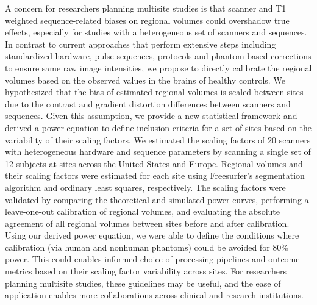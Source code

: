 
A concern for researchers planning multisite studies is that scanner and T1 weighted sequence-related biases on regional volumes could overshadow true effects, especially for studies with a heterogeneous set of scanners and sequences. In contrast to current approaches that perform extensive steps including standardized hardware, pulse sequences, protocols and phantom based corrections to ensure same raw image intensities, we propose to directly calibrate the regional volumes based on the observed values in the brains of healthy controls. We hypothesized that the bias of estimated regional volumes is scaled between sites due to the contrast and gradient distortion differences between scanners and sequences. Given this assumption, we provide a new statistical framework and derived a power equation to define inclusion criteria for a set of sites based on the variability of their scaling factors. We estimated the scaling factors of 20 scanners with heterogeneous hardware and sequence parameters by scanning a single set of 12 subjects at sites across the United States and Europe. Regional volumes and their scaling factors were estimated for each site using Freesurfer's segmentation algorithm and ordinary least squares, respectively. The scaling factors were validated by comparing the theoretical and simulated power curves, performing a leave-one-out calibration of regional volumes, and evaluating the absolute agreement of all regional volumes between sites before and after calibration. Using our derived power equation, we were able to define the conditions where calibration (via human and nonhuman phantoms) could be avoided for 80\% power. This could enables informed choice of processing pipelines and outcome metrics based on their scaling factor variability across sites. For researchers planning multisite studies, these guidelines may be useful, and the ease of application enables more collaborations across clinical and research institutions.